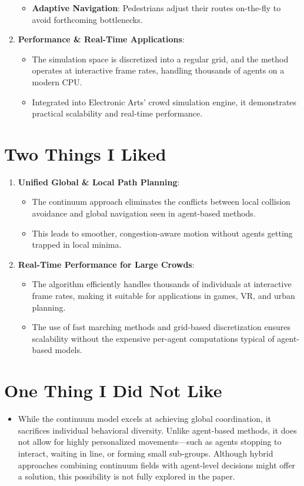 \documentclass[12pt]{article}
\begin{document}
\begin{enumerate}[noitemsep]
\begin{itemize}[noitemsep]
        \item \textbf{Adaptive Navigation}: Pedestrians adjust their routes on-the-fly to avoid forthcoming bottlenecks.
    \end{itemize}
    \item \textbf{Performance \& Real-Time Applications}:
    \begin{itemize}[noitemsep]
        \item The simulation space is discretized into a regular grid, and the method operates at interactive frame rates, handling thousands of agents on a modern CPU.
        \item Integrated into Electronic Arts' crowd simulation engine, it demonstrates practical scalability and real-time performance.
    \end{itemize}
\end{enumerate}

\section{Two Things I Liked}
\begin{enumerate}[noitemsep]
    \item \textbf{Unified Global \& Local Path Planning}:
    \begin{itemize}[noitemsep]
        \item The continuum approach eliminates the conflicts between local collision avoidance and global navigation seen in agent-based methods.
        \item This leads to smoother, congestion-aware motion without agents getting trapped in local minima.
    \end{itemize}
    \item \textbf{Real-Time Performance for Large Crowds}:
    \begin{itemize}[noitemsep]
        \item The algorithm efficiently handles thousands of individuals at interactive frame rates, making it suitable for applications in games, VR, and urban planning.
        \item The use of fast marching methods and grid-based discretization ensures scalability without the expensive per-agent computations typical of agent-based models.
    \end{itemize}
\end{enumerate}

\section{One Thing I Did Not Like}
\begin{itemize}[noitemsep]
    \item While the continuum model excels at achieving global coordination, it sacrifices individual behavioral diversity. Unlike agent-based methods, it does not allow for highly personalized movements—such as agents stopping to interact, waiting in line, or forming small sub-groups. Although hybrid approaches combining continuum fields with agent-level decisions might offer a solution, this possibility is not fully explored in the paper.
\end{itemize}
\end{document}
